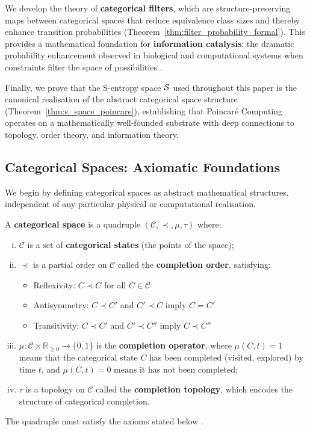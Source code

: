 We develop the theory of \textbf{categorical filters}, which are structure-preserving maps between categorical spaces that reduce equivalence class sizes and thereby enhance transition probabilities (Theorem~\ref{thm:filter_probability_formal}). This provides a mathematical foundation for \textbf{information catalysis}: the dramatic probability enhancement observed in biological and computational systems when constraints filter the space of possibilities \citep{mizraji2021biological}.

Finally, we prove that the S-entropy space $\mathcal{S}$ used throughout this paper is the canonical realisation of the abstract categorical space structure (Theorem~\ref{thm:s_space_poincare}), establishing that Poincaré Computing operates on a mathematically well-founded substrate with deep connections to topology, order theory, and information theory.

\subsection{Categorical Spaces: Axiomatic Foundations}

We begin by defining categorical spaces as abstract mathematical structures, independent of any particular physical or computational realisation.

\begin{definition}
\label{def:categorical_space_formal}
A \textbf{categorical space} is a quadruple $(\mathcal{C}, \prec, \mu, \tau)$ where:
\begin{enumerate}[(i)]
    \item $\mathcal{C}$ is a set of \textbf{categorical states} (the points of the space);
    
    \item $\prec$ is a partial order on $\mathcal{C}$ called the \textbf{completion order}, satisfying:
    \begin{itemize}
        \item Reflexivity: $C \prec C$ for all $C \in \mathcal{C}$
        \item Antisymmetry: $C \prec C'$ and $C' \prec C$ imply $C = C'$
        \item Transitivity: $C \prec C'$ and $C' \prec C''$ imply $C \prec C''$
    \end{itemize}
    
    \item $\mu: \mathcal{C} \times \mathbb{R}_{\geq 0} \to \{0, 1\}$ is the \textbf{completion operator}, where $\mu(C, t) = 1$ means that the categorical state $C$ has been completed (visited, explored) by time $t$, and $\mu(C, t) = 0$ means it has not been completed;
    
    \item $\tau$ is a topology on $\mathcal{C}$ called the \textbf{completion topology}, which encodes the structure of categorical completion.
\end{enumerate}

The quadruple must satisfy the axioms stated below \citep{sachikonye2024categorical}.
\end{definition}


